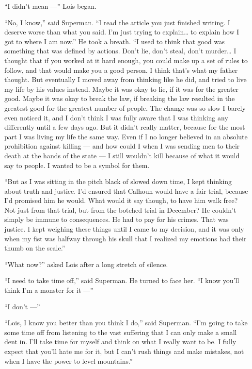 ``I didn't mean ---'' Lois began.

``No, I know,'' said Superman. ``I read the article you just finished
writing. I deserve worse than what you said. I'm just trying to
explain\ldots{} to explain how I got to where I am now.'' He took a
breath. ``I used to think that good was something that was defined by
actions. Don't lie, don't steal, don't murder\ldots{} I thought that if
you worked at it hard enough, you could make up a set of rules to
follow, and that would make you a good person. I think that's what my
father thought. But eventually I moved away from thinking like he did,
and tried to live my life by his values instead. Maybe it was okay to
lie, if it was for the greater good. Maybe it was okay to break the law,
if breaking the law resulted in the greatest good for the greatest
number of people. The change was so slow I barely even noticed it, and I
don't think I was fully aware that I was thinking any differently until
a few days ago. But it didn't really matter, because for the most part I
was living my life the same way. Even if I no longer believed in an
absolute prohibition against killing --- and how could I when I was
sending men to their death at the hands of the state --- I still
wouldn't kill because of what it would say to people. I wanted to be a
symbol for them.

``But as I was sitting in the pitch black of slowed down time, I kept
thinking about truth and justice. I'd ensured that Calhoun would have a
fair trial, because I'd promised him he would. What would it say though,
to have him walk free? Not just from that trial, but from the botched
trial in December? He couldn't simply be immune to consequences. He had
to pay for his crimes. That was justice. I kept weighing these things
until I came to my decision, and it was only when my fist was halfway
through his skull that I realized my emotions had their thumb on the
scale.''

``What now?'' asked Lois after a long stretch of silence.

``I need to take time off,'' said Superman. He turned to face her. ``I
know you'll think I'm a monster for it ---''

``I don't ---''

``Lois, I know you better than you think I do,'' said Superman. ``I'm
going to take some time off from listening to the vast suffering that I
can only make a small dent in. I'll take time for myself and think on
what I really want to be. I fully expect that you'll hate me for it, but
I can't rush things and make mistakes, not when I have the power to
level mountains.''

